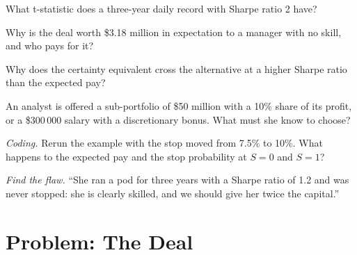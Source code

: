 \begin{exercise}[$\star$]\label{exo:in:portfolio-manager-and-pod-analyst:3}
What t-statistic does a three-year daily record with Sharpe ratio 2 have?
\end{exercise}

\begin{exercise}[$\star\star$]\label{exo:in:portfolio-manager-and-pod-analyst:4}
Why is the deal worth \$3.18 million in expectation to a manager with no skill, and who pays for it?
\end{exercise}

\begin{exercise}[$\star\star$]\label{exo:in:portfolio-manager-and-pod-analyst:5}
Why does the certainty equivalent cross the alternative at a higher Sharpe ratio than the expected pay?
\end{exercise}

\begin{exercise}[$\star\star$]\label{exo:in:portfolio-manager-and-pod-analyst:6}
An analyst is offered a sub-portfolio of \$50 million with a 10\% share of its profit, or a \$300\,000 salary with a
discretionary bonus. What must she know to choose?
\end{exercise}

\begin{exercise}[$\star\star\star$]\label{exo:in:portfolio-manager-and-pod-analyst:7}
\emph{Coding.} Rerun the example with the stop moved from 7.5\% to 10\%. What happens to the expected pay and the stop
probability at $S=0$ and $S=1$?
\end{exercise}

\begin{exercise}[$\star\star\star$]\label{exo:in:portfolio-manager-and-pod-analyst:8}
\emph{Find the flaw.} ``She ran a pod for three years with a Sharpe ratio of 1.2 and was never stopped: she is clearly
skilled, and we should give her twice the capital.''
\end{exercise}

\section{Problem: The Deal}

